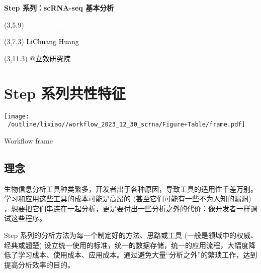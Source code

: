 \documentclass[
]{article}
\author{}
\date{\vspace{-2.5em}}
\begin{document}
\begin{titlepage} 
\begin{center} \textbf{\Huge Step 系列：scRNA-seq
基本分析} \vspace{4em}
\begin{textblock}{10}(3,5.9) \huge
\textbf{\textcolor{white}{2024-02-04}}
\end{textblock} \begin{textblock}{10}(3,7.3)
\Large \textcolor{black}{LiChuang Huang}
\end{textblock} \begin{textblock}{10}(3,11.3)
\Large \textcolor{black}{@立效研究院}
\end{textblock} \end{center} \end{titlepage}
\restoregeometry


\tableofcontents

\listoffigures

\listoftables

\newpage


\hypertarget{step}{%
\section{Step 系列共性特征}\label{step}}

\def\@captype{figure}
\begin{center}
\texttt{[image: ~/outline/lixiao//workflow\_2023\_12\_30\_scrna/Figure+Table/frame.pdf]}
\caption{Workflow frame}\label{fig:workflow-frame}
\end{center}

\hypertarget{ux7406ux5ff5}{%
\subsection{理念}\label{ux7406ux5ff5}}

生物信息分析工具种类繁多，开发者出于各种原因，导致工具的适用性千差万别。学习和应用这些工具的成本可能是高昂的 (甚至它们可能有一些不为人知的漏洞) ，想要把它们串连在一起分析，更是要付出一些分析之外的代价：像开发者一样调试这些程序。

Step 系列的分析方法为每一个制定好的方法、思路或工具 (一般是领域中的权威、经典或翘楚) 设立统一使用的标准，统一的数据存储，统一的应用流程，大幅度降低了学习成本、使用成本、应用成本。通过避免大量``分析之外''的繁琐工作，达到提高分析效率的目的。
\end{document}
